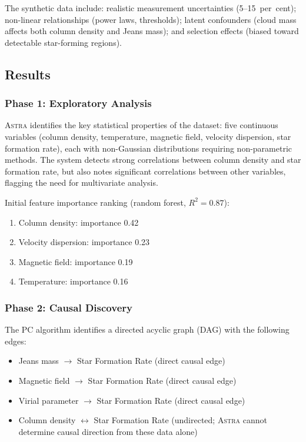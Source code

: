 \documentclass[usenatbib]{rasti}
\newcommand{\astra}{\textsc{Astra}\xspace}
\newcommand{\pc}{PC\xspace}
\begin{document}
The synthetic data include: realistic measurement uncertainties (5--15~per~cent); non-linear relationships (power laws, thresholds); latent confounders (cloud mass affects both column density and Jeans mass); and selection effects (biased toward detectable star-forming regions).

\subsection{Results}
\label{sec:tc6:results}

\subsubsection{Phase 1: Exploratory Analysis}
\label{sec:tc6:phase1}

\astra identifies the key statistical properties of the dataset: five continuous variables (column density, temperature, magnetic field, velocity dispersion, star formation rate), each with non-Gaussian distributions requiring non-parametric methods.
The system detects strong correlations between column density and star formation rate, but also notes significant correlations between other variables, flagging the need for multivariate analysis.

Initial feature importance ranking (random forest, $R^{2} = 0.87$):
\begin{enumerate}
  \item[(i)] Column density: importance 0.42
  \item[(ii)] Velocity dispersion: importance 0.23
  \item[(iii)] Magnetic field: importance 0.19
  \item[(iv)] Temperature: importance 0.16
\end{enumerate}

\subsubsection{Phase 2: Causal Discovery}
\label{sec:tc6:phase2}

The \pc algorithm identifies a directed acyclic graph (DAG) with the following edges:
\begin{itemize}
  \item Jeans mass $\rightarrow$ Star Formation Rate (direct causal edge)
  \item Magnetic field $\rightarrow$ Star Formation Rate (direct causal edge)
  \item Virial parameter $\rightarrow$ Star Formation Rate (direct causal edge)
  \item Column density $\leftrightarrow$ Star Formation Rate (undirected; \astra cannot determine causal direction from these data alone)
\end{itemize}
\end{document}
